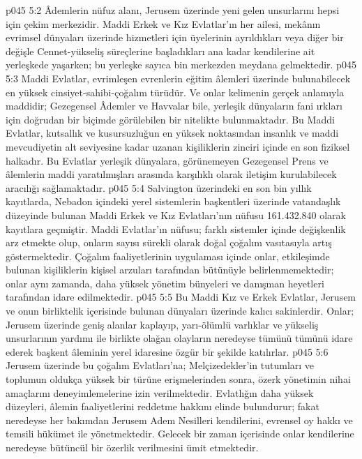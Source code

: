 \vs p045 5:2 Âdemlerin nüfuz alanı, Jerusem üzerinde yeni gelen unsurlarını hepsi için çekim merkezidir. Maddi Erkek ve Kız Evlatlar’ın her ailesi, mekânın evrimsel dünyaları üzerinde hizmetleri için üyelerinin ayrıldıkları veya diğer bir değişle Cennet\hyp{}yükseliş süreçlerine başladıkları ana kadar kendilerine ait yerleşkede yaşarken; bu yerleşke sayıca bin merkezden meydana gelmektedir.
\vs p045 5:3 Maddi Evlatlar, evrimleşen evrenlerin eğitim âlemleri üzerinde bulunabilecek en yüksek cinsiyet\hyp{}sahibi\hyp{}çoğalım türüdür. Ve onlar kelimenin gerçek anlamıyla maddidir; Gezegensel Âdemler ve Havvalar bile, yerleşik dünyaların fani ırkları için doğrudan bir biçimde görülebilen bir nitelikte bulunmaktadır. Bu Maddi Evlatlar, kutsallık ve kusursuzluğun en yüksek noktasından insanlık ve maddi mevcudiyetin alt seviyesine kadar uzanan kişiliklerin zinciri içinde en son fiziksel halkadır. Bu Evlatlar yerleşik dünyalara, görünemeyen Gezegensel Prens ve âlemlerin maddi yaratılmışları arasında karşılıklı olarak iletişim kurulabilecek aracılığı sağlamaktadır.
\vs p045 5:4 Salvington üzerindeki en son bin yıllık kayıtlarda, Nebadon içindeki yerel sistemlerin başkentleri üzerinde vatandaşlık düzeyinde bulunan Maddi Erkek ve Kız Evlatları’nın nüfusu 161.432.840 olarak kayıtlara geçmiştir. Maddi Evlatlar’ın nüfusu; farklı sistemler içinde değişkenlik arz etmekte olup, onların sayısı sürekli olarak doğal çoğalım vasıtasıyla artış göstermektedir. Çoğalım faaliyetlerinin uygulaması içinde onlar, etkileşimde bulunan kişiliklerin kişisel arzuları tarafından bütünüyle belirlenmemektedir; onlar aynı zamanda, daha yüksek yönetim bünyeleri ve danışman heyetleri tarafından idare edilmektedir.
\vs p045 5:5 Bu Maddi Kız ve Erkek Evlatlar, Jerusem ve onun birliktelik içerisinde bulunan dünyaları üzerinde kalıcı sakinlerdir. Onlar; Jerusem üzerinde geniş alanlar kaplayıp, yarı\hyp{}ölümlü varlıklar ve yükseliş unsurlarının yardımı ile birlikte olağan olayların neredeyse tümünü tümünü idare ederek başkent âleminin yerel idaresine özgür bir şekilde katılırlar.
\vs p045 5:6 Jerusem üzerinde bu çoğalım Evlatları’na; Melçizedekler’in tutumları ve toplumun oldukça yüksek bir türüne erişmelerinden sonra, özerk yönetimin nihai amaçlarını deneyimlemelerine izin verilmektedir. Evlatlığın daha yüksek düzeyleri, âlemin faaliyetlerini reddetme hakkını elinde bulundurur; fakat neredeyse her bakımdan Jerusem Adem Nesilleri kendilerini, evrensel oy hakkı ve temsili hükümet ile yönetmektedir. Gelecek bir zaman içerisinde onlar kendilerine neredeyse bütüncül bir özerlik verilmesini ümit etmektedir.
